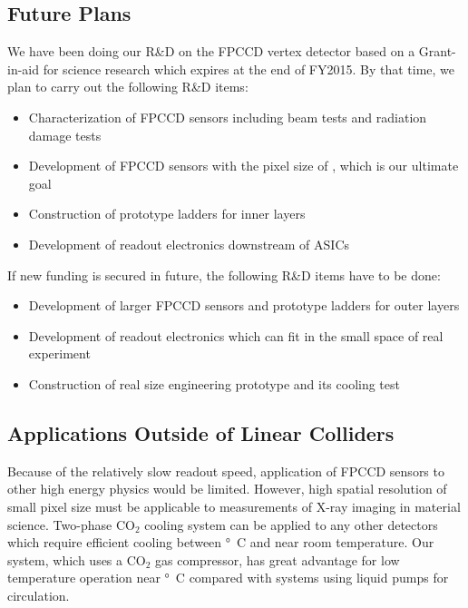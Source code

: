 \subsection{Future Plans}
    We have been doing our R\&D on the FPCCD vertex detector based on a Grant-in-aid for science research which expires at the end of FY2015. By that time, we plan to carry out the following R\&D items:
\begin{itemize}
    \item Characterization of FPCCD sensors including beam tests and radiation damage tests
    \item Development of FPCCD sensors with the pixel size of \unit[5]{\micron}, which is our ultimate goal
    \item Construction of prototype ladders for inner layers
    \item Development of readout electronics downstream of ASICs
\end{itemize}
If new funding is secured in future, the following R\&D items have to be done:
\begin{itemize}
    \item Development of larger FPCCD sensors and prototype ladders for outer layers
    \item Development of readout electronics which can fit in the small space of real experiment
    \item Construction of real size engineering prototype and its cooling test
\end{itemize}

\subsection{Applications Outside of Linear Colliders}
    Because of the relatively slow readout speed, application of FPCCD sensors to other high energy physics would be limited. However, high spatial resolution of small pixel size must be applicable to measurements of X-ray imaging in material science. 
    Two-phase $\text{CO}_2$ cooling system can be applied to any other detectors which require efficient cooling between \unit[-40]{\degree C} and near room temperature. Our system, which uses a $\text{CO}_2$ gas compressor, has great advantage for low temperature operation near \unit[-40]{\degree C} compared with systems using liquid pumps for circulation.

